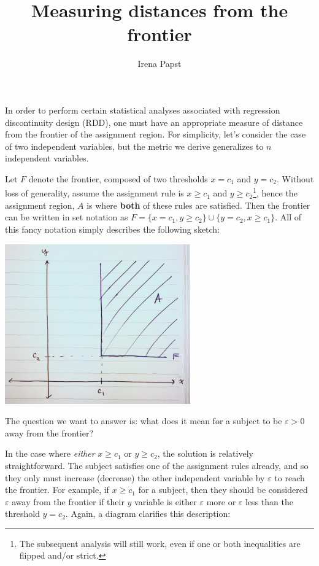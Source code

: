\documentclass[
]{article}
\title{Measuring distances from the frontier}
\author{Irena Papst}
\date{}
\begin{document}
\maketitle

In order to perform certain statistical analyses associated with
regression discontinuity design (RDD), one must have an appropriate
measure of distance from the frontier of the assignment region. For
simplicity, let's consider the case of two independent variables, but
the metric we derive generalizes to \(n\) independent variables.

Let \(F\) denote the frontier, composed of two thresholds \(x = c_1\)
and \(y = c_2\). Without loss of generality, assume the assignment rule
is \(x \geq c_1\) and
\(y \geq c_2\)\footnote{The subsequent analysis will still work, even if one or both inequalities are flipped and/or strict.},
hence the assignment region, \(A\) is where \textbf{both} of these rules
are satisfied. Then the frontier can be written in set notation as
\(F = \{ x = c_1 , y \geq c_2 \} \cup \{ y = c_2, x \geq c_1\}\). All of
this fancy notation simply describes the following sketch:

\begin{center}
\includegraphics[width=0.6\textwidth]{figs/f1.png}
\end{center}

The question we want to answer is: what does it mean for a subject to be
\(\varepsilon > 0\) away from the frontier?

In the case where \emph{either} \(x \geq c_1\) or \(y \geq c_2\), the
solution is relatively straightforward. The subject satisfies one of the
assignment rules already, and so they only must increase (decrease) the
other independent variable by \(\varepsilon\) to reach the frontier. For
example, if \(x \geq c_1\) for a subject, then they should be considered
\(\varepsilon\) away from the frontier if their \(y\) variable is either
\(\varepsilon\) more or \(\varepsilon\) less than the threshold
\(y=c_2\). Again, a diagram clarifies this description:
\end{document}

